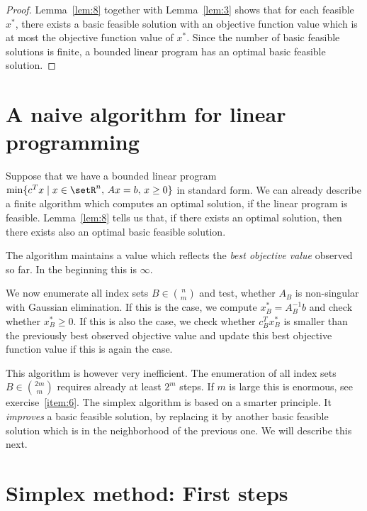 \begin{proof}
  Lemma~\ref{lem:8} together with Lemma~\ref{lem:3} shows that for
  each feasible $x^*$, there exists a basic feasible solution with an
  objective function value which is at most the objective function
  value of $x^*$. 
  Since the number of basic feasible solutions is finite, 
  a bounded linear program has an optimal basic feasible solution.

\end{proof}



\section{A naive algorithm for linear programming} 
 \label{sec:naive-algor-line}
 
 Suppose that we have a bounded linear program $\min\{c^Tx \mid x \in
 \setR^n, \,Ax = b,\, x\geq0\}$ in standard form. We can already describe a
 finite algorithm which computes an optimal solution, if the linear
 program is feasible. Lemma~\ref{lem:8} tells us that, if there exists
 an optimal solution, then there exists also an optimal basic feasible
 solution. 

 
The algorithm maintains a value which reflects the \emph{best
  objective value} observed so far. In the beginning this is $\infty$. 

We now enumerate all index sets $B \in \binom{n}{m}$ and test, whether
$A_B$ is non-singular with Gaussian elimination. If this is the case,
we compute $x^*_B = A_B^{-1}b$ and check whether $x^*_B\geq0$. If this
is also the case, we check whether $c_B^Tx^*_B$ is smaller than the
previously best observed objective value and update this best
objective function value if this is again the case.

This algorithm is however very inefficient. The enumeration of all
index sets $B \in \binom{2m}{m}$ requires already at least $2^m$
steps. 
If $m$ is large this is enormous, see exercise~\ref{item:6}. 
The simplex algorithm is based on a smarter principle.
It \emph{improves} a basic feasible solution, by replacing it by
another basic feasible solution which is in the neighborhood of the
previous one. We will describe this next.
 



\section{Simplex method: First steps}
\label{sec:simplex-method}

